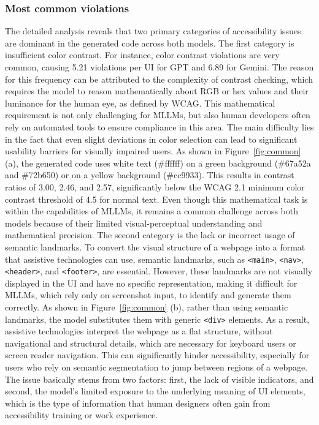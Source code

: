 \subsubsection{Most common violations}
The detailed analysis reveals that two primary categories of accessibility
issues are dominant in the generated code across both models.
The first category is insufficient color contrast. For instance,
color contrast violations are very common, causing 5.21 violations 
per UI for GPT and 6.89 for Gemini. The reason for this frequency 
can be attributed to the complexity of contrast checking, which 
requires the model to reason mathematically about RGB or hex values
and their luminance for the human eye, as defined by WCAG. This mathematical 
requirement is not only challenging for MLLMs, but also human 
developers often rely on automated tools to ensure compliance 
in this area. The main difficulty lies in the fact that 
even slight deviations in color selection can lead to significant 
usability barriers for visually impaired users. As shown in 
Figure~\ref{fig:common} (a), the generated code uses white text 
(\#ffffff) on a green background (\#67a52a and \#72b650)
or on a yellow background (\#cc9933). This results in 
contrast ratios of 3.00, 2.46, and 2.57, significantly below the
WCAG 2.1 minimum color contrast threshold of 4.5 for normal text.
Even though this mathematical task is within the capabilities of 
MLLMs, it remains a common challenge across both models because 
of their limited visual-perceptual understanding and mathematical 
precision.\newline
The second category is the lack or incorrect usage of semantic 
landmarks. To convert 
the visual structure of a webpage into a format that
assistive technologies can use, semantic landmarks, 
such as \texttt{<main>}, \texttt{<nav>},
\texttt{<header>}, and \texttt{<footer>}, are essential. 
However, these landmarks are not visually 
displayed in the UI and have no specific representation, making it 
difficult for MLLMs, which rely only on screenshot input,
to identify and generate them correctly. As 
shown in Figure~\ref{fig:common} (b), rather than using 
semantic landmarks, the model substitutes them with 
generic \texttt{<div>} elements. As a result, assistive technologies 
interpret the webpage as a flat structure, without navigational 
and structural details, which are necessary for keyboard users or 
screen reader navigation. This can significantly hinder 
accessibility, especially for users who rely on 
semantic segmentation to jump between regions of a webpage. 
The issue basically stems from two factors: first, the lack of 
visible indicators, and second, the model’s limited exposure to 
the underlying meaning of UI elements, which is the type of 
information that human designers often gain from accessibility training or work experience.

